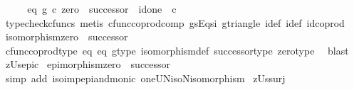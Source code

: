 \begin{isabellebody}
\ \ \isamarkupfalse%
\ \isamarkupfalse%
\ eq{}{\isacharcolon}{\kern0pt}\ {\isachardoublequoteopen}g\ {\isasymcirc}\isactrlsub c\ {\isacharparenleft}{\kern0pt}zero\ {\isasymamalg}\ successor{\isacharparenright}{\kern0pt}\ {\isacharequal}{\kern0pt}\ id{\isacharparenleft}{\kern0pt}one\ {\isasymCoprod}\ {\isasymnat}\isactrlsub c{\isacharparenright}{\kern0pt}{\isachardoublequoteclose}\isanewline
\ \ \ \ \isamarkupfalse%
\ {\isacharparenleft}{\kern0pt}typecheck{\isacharunderscore}{\kern0pt}cfuncs{\isacharcomma}{\kern0pt}\ metis\ cfunc{\isacharunderscore}{\kern0pt}coprod{\isacharunderscore}{\kern0pt}comp\ g{\isacharunderscore}{\kern0pt}sEqs{\isacharunderscore}{\kern0pt}i{}\ g{\isacharunderscore}{\kern0pt}triangle\ i{}{\isacharunderscore}{\kern0pt}def\ i{}{\isacharunderscore}{\kern0pt}def\ id{\isacharunderscore}{\kern0pt}coprod{\isacharparenright}{\kern0pt}\isanewline
\ \ \isamarkupfalse%
\ {\isachardoublequoteopen}isomorphism{\isacharparenleft}{\kern0pt}zero\ {\isasymamalg}\ successor{\isacharparenright}{\kern0pt}{\isachardoublequoteclose}\isanewline
\ \ \ \ \isamarkupfalse%
\ cfunc{\isacharunderscore}{\kern0pt}coprod{\isacharunderscore}{\kern0pt}type\ eq{}\ eq{}\ g{\isacharunderscore}{\kern0pt}type\ isomorphism{\isacharunderscore}{\kern0pt}def{}\ successor{\isacharunderscore}{\kern0pt}type\ zero{\isacharunderscore}{\kern0pt}type\ \isamarkupfalse%
\ blast\isanewline
{}\isamarkupfalse%
%
\endisatagproof
{\isafoldproof}%
%
\isadelimproof
\isanewline
%
\endisadelimproof
\isanewline
{}\isamarkupfalse%
\ zUs{\isacharunderscore}{\kern0pt}epic{\isacharcolon}{\kern0pt}\isanewline
\ {\isachardoublequoteopen}epimorphism{\isacharparenleft}{\kern0pt}zero\ {\isasymamalg}\ successor{\isacharparenright}{\kern0pt}{\isachardoublequoteclose}\isanewline
%
\isadelimproof
\ \ %
\endisadelimproof
%
\isatagproof
{}\isamarkupfalse%
\ {\isacharparenleft}{\kern0pt}simp\ add{\isacharcolon}{\kern0pt}\ iso{\isacharunderscore}{\kern0pt}imp{\isacharunderscore}{\kern0pt}epi{\isacharunderscore}{\kern0pt}and{\isacharunderscore}{\kern0pt}monic\ oneUN{\isacharunderscore}{\kern0pt}iso{\isacharunderscore}{\kern0pt}N{\isacharunderscore}{\kern0pt}isomorphism{\isacharparenright}{\kern0pt}%
\endisatagproof
{\isafoldproof}%
%
\isadelimproof
\isanewline
%
\endisadelimproof
\isanewline
{}\isamarkupfalse%
\ zUs{\isacharunderscore}{\kern0pt}surj{\isacharcolon}{\kern0pt}\isanewline

\end{isabellebody}
